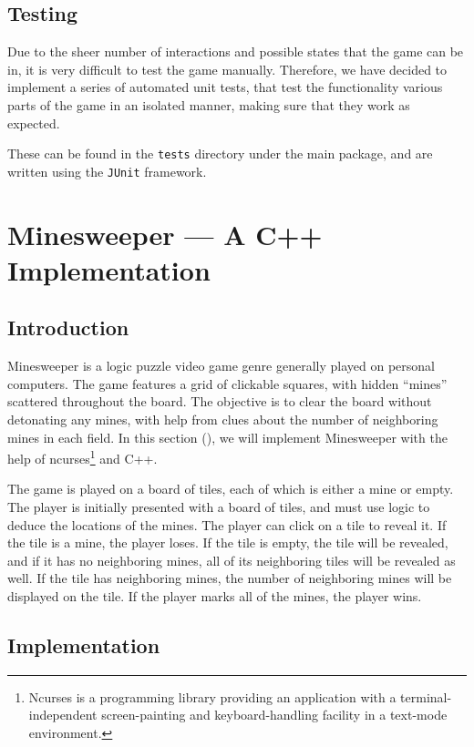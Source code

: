 \documentclass{article}
\newcommand{\code}[1]{\texttt{#1}}
\begin{document}
\subsection{Testing}

Due to the sheer number of interactions and possible states that the game can be in, it is very difficult
to test the game manually. Therefore, we have decided to implement a series of automated unit tests, that
test the functionality various parts of the game in an isolated manner, making sure that they work as expected.

These can be found in the \code{tests} directory under the main package, and are written using the
\code{JUnit} framework. 




\newpage

\section{Minesweeper --- A C++ Implementation}

\subsection{Introduction}
Minesweeper is a logic puzzle video game genre generally played on personal
computers. The game features a grid of clickable squares, with hidden ``mines''
scattered throughout the board. The objective is to clear the board without
detonating any mines, with help from clues about the number of neighboring
mines in each field.
In this section (\thesection), we will implement Minesweeper with the help of
ncurses\footnote{Ncurses is a programming library providing an application with a 
	terminal-independent screen-painting and keyboard-handling facility in a
text-mode environment.} and C++.

The game is played on a board of tiles, each of which is either a mine or
empty. The player is initially presented with a board of tiles, and
must use logic to deduce the locations of the mines. The player can click on a
tile to reveal it. If the tile is a mine, the player loses. If the tile is
empty, the tile will be revealed, and if it has no neighboring mines, all of
its neighboring tiles will be revealed as well. If the tile has neighboring
mines, the number of neighboring mines will be displayed on the tile. If the player
marks all of the mines, the player wins.


\subsection{Implementation}
\end{document}
